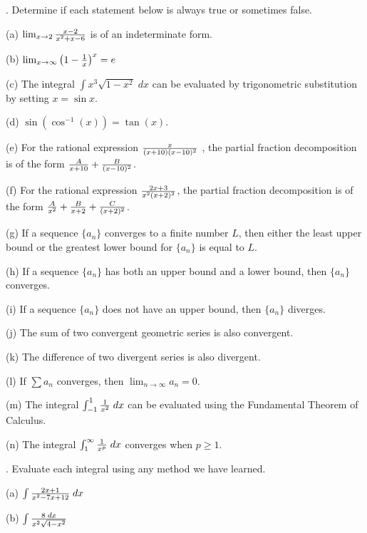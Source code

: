 \documentclass[12pt]{article}
\begin{document}
. Determine if each statement below is always true or sometimes 
false.

\noindent (a) $\lim_{x\to 2} {{x-2}\over{x^2+x-6}}$ is of an 
indeterminate form.

\smallskip
\noindent (b) $\lim_{x\to \infty} \left ( 1-{{1}\over{x}} \right )^x=e$

\smallskip
\noindent (c) The integral $\int x^3 \sqrt{1-x^2} \; dx$ can be evaluated by 
trigonometric substitution by setting $x=\sin x$.

\smallskip
\noindent (d) $\sin(\cos^{-1}(x)) = \tan (x)$.

\smallskip
\noindent (e) For the rational expression ${{x}\over{(x+10)(x-10)^2}}$ , the 
partial fraction decomposition is of the form ${{A}\over{x+10}} + 
{{B}\over{(x-10)^2}}$.

\smallskip
\noindent (f) For the rational expression ${{2x+3}\over{x^2 (x+2)^2}}$, the 
partial fraction decomposition is of the form 
${{A}\over{x^2}}+{{B}\over{x+2}}+{{C}\over{(x+2)^2}}$.

\smallskip
\noindent (g) If a sequence $\{a_n\}$ converges to a finite number $L$, then 
either the least upper bound or the greatest lower bound for $\{a_n\}$ is equal 
to $L$. 

\smallskip
\noindent (h) If a sequence $\{a_n\}$ has both an upper bound and a lower 
bound, then $\{a_n\}$ converges.

\smallskip
\noindent (i) If a sequence $\{a_n\}$ does not have an upper bound, then 
$\{a_n\}$ diverges.

\smallskip
\noindent (j) The sum of two convergent geometric series is also convergent.

\smallskip
\noindent (k) The difference of two divergent series is also divergent.

\smallskip
\noindent (l) If $\sum a_n$ converges, then $\lim_{n \to \infty} a_n = 0$.

\smallskip
\noindent (m) The integral $\int_{-1}^1 {{1}\over{x^2}} \; dx$ can be evaluated 
using the Fundamental Theorem of Calculus.

\smallskip
\noindent (n) The integral $\int_1^{\infty} {{1}\over{x^p}} \; dx$ 
converges when $p\geq 1$. 

\bigskip
{}.  Evaluate each integral using any method we have learned.

\noindent (a) $\int {{2x+1}\over{x^2-7x+12}} \; dx$

\noindent (b) $\int {{8 \; dx}\over{x^2 \sqrt{4-x^2}}}$
\end{document}
